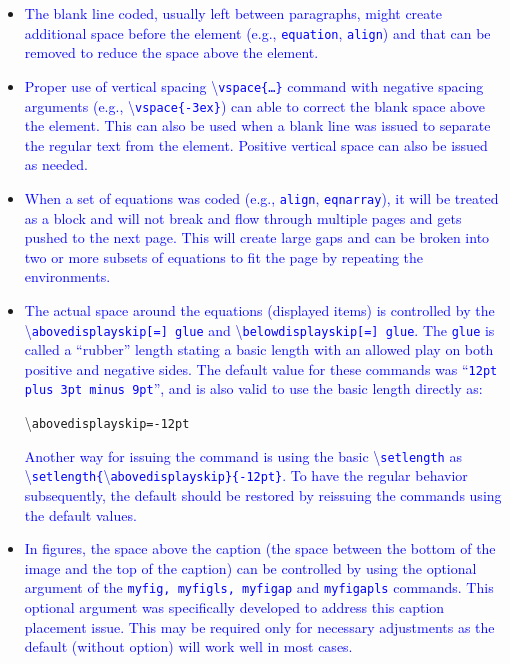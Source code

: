 \documentclass[phd,showgrids]{ndsu-thesis-2022}
\newcommand\italk[1]{\textcolor{blue}{#1}}  %
\newcommand\cmd[1]{\textbackslash\texttt{#1}}  %
\begin{document}
\begin{itemize}
\item
\italk{The blank line coded, usually left between paragraphs, might create additional space before the element (e.g., \texttt{equation}, \texttt{align}) and that can be removed to reduce the space above the element.}
\item
\italk{Proper use of vertical spacing \cmd{vspace\{\ldots\}} command with negative spacing arguments (e.g., \cmd{vspace\{-3ex\}}) can able to correct the blank space above the element. This can also be used when a blank line was issued to separate the regular text from the element. Positive vertical space can also be issued as needed.}
\item
\italk{When a set of equations was coded (e.g., \texttt{align}, \texttt{eqnarray}), it will be treated as a block and will not break and flow through multiple pages and gets pushed to the next page. This will create large gaps and can be broken into two or more subsets of equations to fit the page by repeating the environments.}
\item
\italk{The actual space around the equations (displayed items) is controlled by the \\ \cmd{abovedisplayskip[=] glue} and \cmd{belowdisplayskip[=] glue}.
The \texttt{glue} is called a ``rubber'' length stating a basic length with an allowed play on both positive and negative sides. The default value for these commands was ``\texttt{12pt plus 3pt minus 9pt}'', and is also valid to use the basic length directly as:} 

\cmd{abovedisplayskip=-12pt}

\italk{Another way for issuing the command is using the basic \cmd{setlength} as \\ \cmd{setlength\{}\cmd{abovedisplayskip\}\{-12pt\}}. To have the regular behavior subsequently, the default should be restored by reissuing the commands using the default values.}
\item
\italk{In figures, the space above the caption (the space between the bottom of the image and the top of the caption) can be controlled by using the optional argument of the \texttt{myfig, myfigls, myfigap} and \texttt{myfigapls} commands. This optional argument was specifically developed to address this caption placement issue. This may be required only for necessary adjustments as the default (without option) will work well in most cases.}
\end{itemize}

\end{document}
